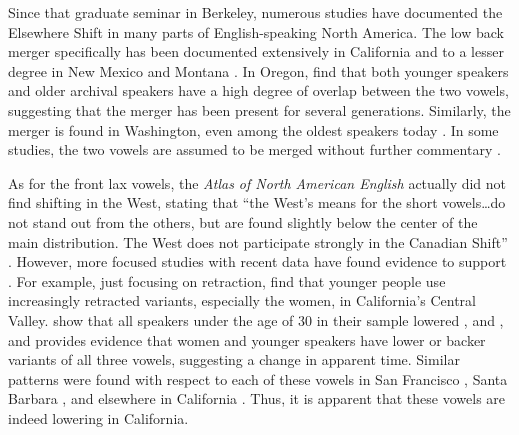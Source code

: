 Since that graduate seminar in Berkeley, numerous studies have documented the Elsewhere Shift in many parts of English-speaking North America. The low back merger specifically has been documented extensively in California \citep{moonwomon_1991_diss, hagiwara_2005, holland_2014_diss} and to a lesser degree in New Mexico \citep{brumbaugh_koops_2017_pads} and Montana \citep[122]{bar_el_etal_2017}. In Oregon, \citet{mclarty_etal_2016} find that both younger speakers and older archival speakers have a high degree of overlap between the two vowels, suggesting that the merger has been present for several generations. Similarly, the merger is found in Washington, even among the oldest speakers today \citep{wassink_2015, wassink_2016_pads}. In some studies, the two vowels are assumed to be merged without further commentary \citep{eckert_2008, podesva_2011, kennedy_grama_2012}.

As for the front lax vowels, the \textit{Atlas of North American English} actually did not find shifting in the West, stating that ``the West’s means for the short vowels\ldots do not stand out from the others, but are found slightly below the center of the main distribution. The West does not participate strongly in the Canadian Shift'' \citep[284--285]{labov_2006}. However, more focused studies with recent data have found evidence to support \citet{hinton_etal_1987}. For example, just focusing on \trap retraction, \citet[16]{donofrio_etal_2017_pads} find that younger people use increasingly retracted variants, especially the women, in California's Central Valley. \citet{kennedy_grama_2012} show that all speakers under the age of 30 in their sample lowered \trap, \dress and \kit, and \citet{holland_2014_diss} provides evidence that women and younger speakers have lower or backer variants of all three vowels, suggesting a change in apparent time. Similar patterns were found with respect to each of these vowels in San Francisco \citep{hall_lew_etal_2015, cardoso_etal_2016_pads}, Santa Barbara \citep{janoff_2018}, and elsewhere in California \citep{brotherton_etal_2019}. Thus, it is apparent that these vowels are indeed lowering in California.

